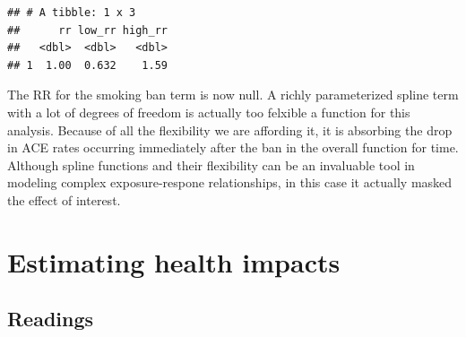 \documentclass[
]{book}
\newenvironment{Shaded}{\begin{snugshade}}{\end{snugshade}}
\newcommand{\DataTypeTok}[1]{\textcolor[rgb]{0.13,0.29,0.53}{#1}}
\newcommand{\DecValTok}[1]{\textcolor[rgb]{0.00,0.00,0.81}{#1}}
\newcommand{\FloatTok}[1]{\textcolor[rgb]{0.00,0.00,0.81}{#1}}
\newcommand{\KeywordTok}[1]{\textcolor[rgb]{0.13,0.29,0.53}{\textbf{#1}}}
\newcommand{\NormalTok}[1]{#1}
\newcommand{\OperatorTok}[1]{\textcolor[rgb]{0.81,0.36,0.00}{\textbf{#1}}}
\newcommand{\StringTok}[1]{\textcolor[rgb]{0.31,0.60,0.02}{#1}}
\begin{document}
\begin{Shaded}
\end{Shaded}

\begin{verbatim}
## # A tibble: 1 x 3
##      rr low_rr high_rr
##   <dbl>  <dbl>   <dbl>
## 1  1.00  0.632    1.59
\end{verbatim}

The RR for the smoking ban term is now null. A richly parameterized spline term with a lot of degrees of freedom is actually too felxible a function for this analysis. Because of all the flexibility we are affording it, it is absorbing the drop in ACE rates occurring immediately after the ban in the overall function for time. Although spline functions and their flexibility can be an invaluable tool in modeling complex exposure-respone relationships, in this case it actually masked the effect of interest.

\hypertarget{estimating-health-impacts}{%
\chapter{Estimating health impacts}\label{estimating-health-impacts}}

\hypertarget{readings-3}{%
\section{Readings}\label{readings-3}}
\end{document}
